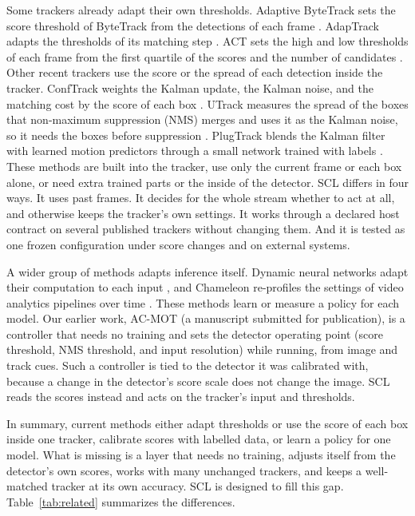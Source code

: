 \documentclass[pdflatex,referee,sn-mathphys-num]{sn-jnl}
\newcommand{\scl}{SCL}
\begin{document}
Some trackers already adapt their own thresholds. Adaptive ByteTrack sets the
score threshold of ByteTrack from the detections of each frame
\cite{ma2023adaptivebytetrack}. AdapTrack adapts the thresholds of its
matching step \cite{shim2024adaptrack}. ACT sets the high and low thresholds
of each frame from the first quartile of the scores and the number of
candidates \cite{act2026adaptive}. Other recent trackers use the score or the
spread of each detection inside the tracker. ConfTrack weights the Kalman
update, the Kalman noise, and the matching cost by the score of each box
\cite{jung2024conftrack}. UTrack measures the spread of the boxes that
non-maximum suppression (NMS) merges and uses it as the Kalman noise, so it needs the
boxes before suppression \cite{solano2025utrack}. PlugTrack blends the Kalman
filter with learned motion predictors through a small network trained with
labels \cite{kim2026plugtrack}. These methods are built into the tracker, use
only the current frame or each box alone, or need extra trained parts or the
inside of the detector. \scl{} differs in four ways. It uses past
frames. It decides for the whole stream whether to act at all, and otherwise
keeps the tracker's own settings. It works through a declared host contract
on several published trackers without changing them. And it is tested as one
frozen configuration under score changes and on external systems.

A wider group of methods adapts inference itself. Dynamic neural networks
adapt their computation to each input \cite{han2022dynamic}, and Chameleon
re-profiles the settings of video analytics pipelines over time
\cite{jiang2018chameleon}. These methods learn or measure a policy for each
model. Our earlier work, AC-MOT (a manuscript submitted for publication), is a controller that
needs no training and sets the detector operating point (score threshold,
NMS threshold, and input resolution) while running, from image and track
cues. Such a controller is tied to the detector it was calibrated with,
because a change in the detector's score scale does not change the image.
\scl{} reads the scores instead and acts on the tracker's input and
thresholds.

In summary, current methods either adapt thresholds or use the score of each
box inside one tracker, calibrate scores with labelled data, or learn a policy
for one model. What is missing is a layer that needs no training, adjusts itself
from the detector's own scores, works with many unchanged trackers, and keeps
a well-matched tracker at its own accuracy. \scl{} is designed to fill this
gap. Table~\ref{tab:related} summarizes the differences.
\end{document}
